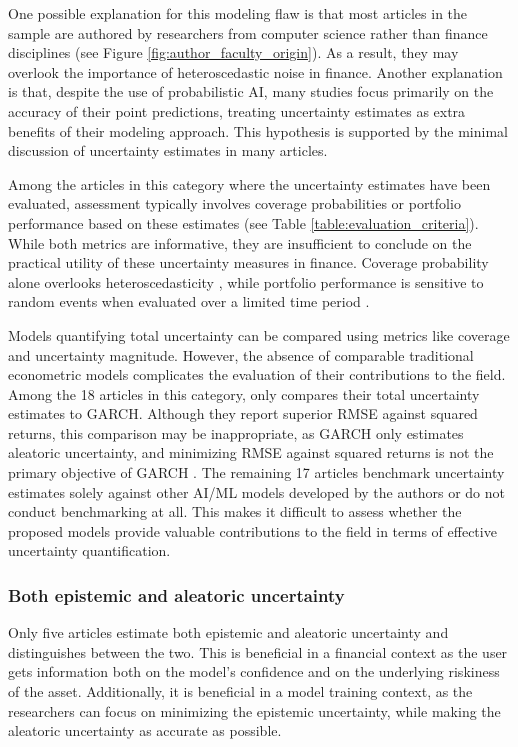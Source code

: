 One possible explanation for this modeling flaw is that most articles in the sample are authored by researchers from computer science rather than finance disciplines (see Figure \ref{fig:author_faculty_origin}). As a result, they may overlook the importance of heteroscedastic noise in finance. Another explanation is that, despite the use of probabilistic AI, many studies focus primarily on the accuracy of their point predictions, treating uncertainty estimates as extra benefits of their modeling approach. This hypothesis is supported by the minimal discussion of uncertainty estimates in many articles.

Among the articles in this category where the uncertainty estimates have been evaluated, assessment typically involves coverage probabilities or portfolio performance based on these estimates (see Table \ref{table:evaluation_criteria}). While both metrics are informative, they are insufficient to conclude on the practical utility of these uncertainty measures in finance. Coverage probability alone overlooks heteroscedasticity \parencite{Christoffersen1998}, while portfolio performance is sensitive to random events when evaluated over a limited time period \parencite{barras2010}.

Models quantifying total uncertainty can be compared using metrics like coverage and uncertainty magnitude. However, the absence of comparable traditional econometric models complicates the evaluation of their contributions to the field. Among the 18 articles in this category, only \textcite{Platanios2014gpr} compares their total uncertainty estimates to GARCH. Although they report superior RMSE against squared returns, this comparison may be inappropriate, as GARCH only estimates aleatoric uncertainty, and minimizing RMSE against squared returns is not the primary objective of GARCH \parencite{BOLLERSLEV1986GARCH}. The remaining 17 articles benchmark uncertainty estimates solely against other AI/ML models developed by the authors or do not conduct benchmarking at all. This makes it difficult to assess whether the proposed models provide valuable contributions to the field in terms of effective uncertainty quantification.

\subsubsection{Both epistemic and aleatoric uncertainty}

Only five articles estimate both epistemic and aleatoric uncertainty and distinguishes between the two. This is beneficial in a financial context as the user gets information both on the model's confidence and on the underlying riskiness of the asset. Additionally, it is beneficial in a model training context, as the researchers can focus on minimizing the epistemic uncertainty, while making the aleatoric uncertainty as accurate as possible.

